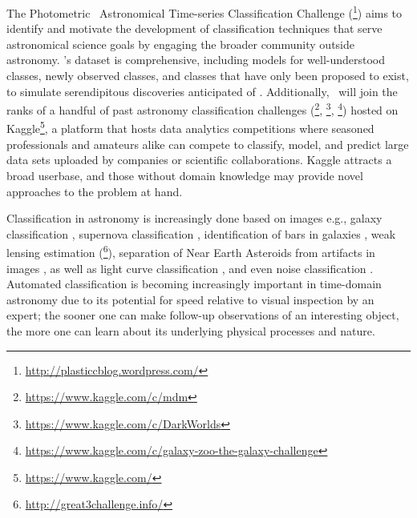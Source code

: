 The Photometric \lsst\ Astronomical Time-series Classification Challenge (\plasticc\footnote{\url{http://plasticcblog.wordpress.com/}}) aims to identify and motivate the development of classification techniques that serve astronomical science goals by engaging the broader community outside astronomy.
\plasticc's dataset is comprehensive, including models for well-understood classes, newly observed classes, and classes that have only been proposed to exist, to simulate serendipitous discoveries anticipated of \lsst.
Additionally, \plasticc\ will join the ranks of a handful of past astronomy classification challenges (\citet{kitching_gravitational_2011}\footnote{\url{https://www.kaggle.com/c/mdm}}, \citet{harvey_observing_2013}\footnote{\url{https://www.kaggle.com/c/DarkWorlds}},  \citet{dieleman_rotation-invariant_2015}\footnote{\url{https://www.kaggle.com/c/galaxy-zoo-the-galaxy-challenge}}) hosted on Kaggle\footnote{\url{https://www.kaggle.com/}}, a platform that hosts data analytics competitions where seasoned professionals and amateurs alike can compete to classify, model, and predict large data sets uploaded by companies or scientific collaborations.
Kaggle attracts a broad userbase, and those without domain knowledge may provide novel approaches to the problem at hand.

Classification in astronomy is increasingly done based on images e.g., galaxy classification \citep{hoyle_measuring_2016}, supernova classification \citep{cabrera-vives_deep-hits:_2017}, identification of bars in galaxies \citep{abraham_detection_2018}, weak lensing estimation (\citet{mandelbaum_third_2014}\footnote{\url{http://great3challenge.info/}}), separation of Near Earth Asteroids from artifacts in images \citep{morii_machine-learning_2016}, as well as light curve classification \citep{morii_machine-learning_2016, mahabal_deep-learnt_2017, zevin_gravity_2017}, and even noise classification \citep{zevin_gravity_2017, george_classification_2018}.
Automated classification \citep{djorgovski_towards_2011, djorgovski_flashes_2012, narayan_machine_2018, bloom_automating_2012} is becoming increasingly important in time-domain astronomy due to its potential for speed relative to visual inspection by an expert; the sooner one can make follow-up observations of an interesting object, the more one can learn about its underlying physical processes and nature.

